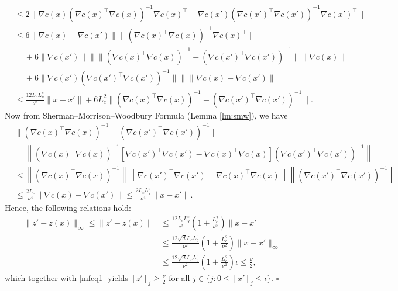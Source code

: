 \documentclass[11pt]{article}
\newenvironment{proof}{{\noindent\it Proof.}\quad}{\hfill $\square$\par}
\begin{document}
\begin{proof}
\begin{align*}
        &\leq 2\|\nabla c(x) (\nabla c(x)^{\top} \nabla c(x))^{-1} \nabla c(x)^{\top} - \nabla c(x') (\nabla c(x')^{\top} \nabla c(x'))^{-1} \nabla c(x')^{\top}\|\\
        &\leq 6\|\nabla c(x) - \nabla c(x')\|\|(\nabla c(x)^{\top} \nabla c(x))^{-1}\nabla c(x)^{\top}\| \\
        &\quad~+ 6\|\nabla c(x')\|\|\|(\nabla c(x)^{\top} \nabla c(x))^{-1} - (\nabla c(x')^{\top} \nabla c(x'))^{-1}\|\|\nabla c(x)\|\\
        &\quad~+ 6\|\nabla c(x')(\nabla c(x')^{\top} \nabla c(x'))^{-1}\|\| \|\nabla c(x) - \nabla c(x')\|\\
        &\leq \frac{12L_c L_g^c}{\nu^2} \|x - x'\| + 6 L_c^2 \|(\nabla c(x)^{\top} \nabla c(x))^{-1} - (\nabla c(x')^{\top} \nabla c(x'))^{-1}\|.
    \end{align*}
    Now from Sherman–Morrison–Woodbury Formula (Lemma \ref{lm:smw}), we have
    \begin{align*}
        & \|(\nabla c(x)^{\top} \nabla c(x))^{-1} - (\nabla c(x')^{\top} \nabla c(x'))^{-1}\| \\
        &= \left\|(\nabla c(x)^{\top} \nabla c(x))^{-1} \left[\nabla c(x')^{\top} \nabla c(x') - \nabla c(x)^{\top} \nabla c(x)\right] (\nabla c(x')^{\top} \nabla c(x'))^{-1}\right\|\\
        &\leq \left\|(\nabla c(x)^{\top} \nabla c(x))^{-1}\right\| \left\|\nabla c(x')^{\top} \nabla c(x') - \nabla c(x)^{\top} \nabla c(x)\right\| \left\| (\nabla c(x')^{\top} \nabla c(x'))^{-1}\right\|\\
        &\leq \frac{2L_c}{\nu^4}\|\nabla c(x) - \nabla c(x')\| \leq \frac{2L_c L_g^c}{\nu^4}\|x- x'\|.
    \end{align*}
    Hence, the following relations hold:
    \begin{align*}
    \|z' - z(x)\|_\infty \leq \|z' - z(x)\| & \le \frac{12L_c L_g^c}{\nu^2}\left(1 + \frac{L_c^2}{\nu^2}\right)\|x- x'\|\\
    & \leq \frac{12\sqrt{d}L_c L_g^c}{\nu^2}\left(1 + \frac{L_c^2}{\nu^2}\right) \|x-x'\|_\infty \\
    & \le \frac{12\sqrt{d}L_c L_g^c}{\nu^2}\left(1 + \frac{L_c^2}{\nu^2}\right) \iota \le \frac{\nu}{2},
    \end{align*}
    which together with \eqref{mfcq1} yields \([z']_j \ge \frac{\nu}{2}\) for all \(j \in \{ j : 0 \leq [x']_j \leq \iota \}.\)
\end{proof}
\end{document}
